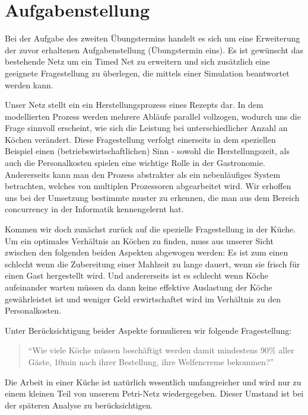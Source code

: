 \section*{Aufgabenstellung} %
\label{sec:aufgabenstellung}
Bei der Aufgabe des zweiten Übungstermins handelt es sich um eine Erweiterung der zuvor erhaltenen Aufgabenstellung (Übungstermin eins). Es ist gewünscht das bestehende Netz um ein Timed Net zu erweitern und sich zusätzlich eine geeignete Fragestellung zu überlegen, die mittels einer Simulation beantwortet werden kann.

Unser Netz stellt ein ein Herstellungsprozess eines Rezepts dar. In dem modellierten Prozess werden mehrere Abläufe parallel vollzogen, wodurch uns die Frage sinnvoll erscheint, wie sich die Leistung bei unterschiedlicher Anzahl an Köchen verändert. Diese Fragestellung verfolgt einerseits in dem speziellen Beispiel einen (betriebswirtschaftlichen) Sinn - sowohl die Herstellungszeit, als auch die Personalkosten spielen eine wichtige Rolle in der Gastronomie. Andererseits kann man den Prozess abstrakter als ein nebenläufiges System betrachten, welches von multiplen Prozessoren abgearbeitet wird. Wir erhoffen uns bei der Umsetzung bestimmte muster zu erkennen, die man aus dem Bereich concurrency in der Informatik kennengelernt hat.

Kommen wir doch zunächst zurück auf die spezielle Fragestellung in der Küche. Um ein optimales Verhältnis an Köchen zu finden, muss aus unserer Sicht zwischen den folgenden beiden Aspekten abgewogen werden: Es ist zum einen schlecht wenn die Zubereitung einer Mahlzeit zu lange dauert, wenn sie frisch für einen Gast hergestellt wird. Und andererseits ist es schlecht wenn Köche aufeinander warten müssen da dann keine effektive Auslastung der Köche gewährleistet ist und weniger Geld erwirtschaftet wird im Verhältnis zu den Personalkosten.

Unter Berücksichtigung beider Aspekte formulieren wir folgende Fragestellung:

\begin{quote}
\begin{tt}
\begin{center}
``Wie viele Köche müssen beschäftigt werden damit mindestens 90\% aller Gäste, 10min nach ihrer Bestellung, ihre Welfencreme bekommen?''
\end{center}
\end{tt}
\end{quote}
Die Arbeit in einer Küche ist natürlich wesentlich umfangreicher und wird nur zu einem kleinen Teil von unserem Petri-Netz wiedergegeben. Dieser Umstand ist bei der späteren Analyse zu berücksichtigen.

